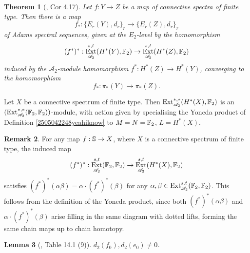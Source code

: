 \documentclass[11pt, titlepage]{article} %
\def\bb{\ensuremath\mathbb}
\def\A{\ensuremath{\mathscr{A}_2}}
\DeclareMathOperator{\Ext}{Ext}
\numberwithin{equation}{subsection}
\theoremstyle{plain}
\newtheorem{theorem}{Theorem}[subsection]
\newtheorem{lemma}[theorem]{Lemma}
\theoremstyle{definition}
\newtheorem{remark}[theorem]{Remark}
\begin{document}
\begin{theorem}[{\autocite{ass}, Cor 4.17}]\label{2504141019}
Let \(f : Y \to Z\) be a map of connective spectra of finite type. Then there is a map
\[f_* : \{E_r(Y), d_r\}_r \to \{E_r(Z), d_r\}_r\]
of Adams spectral sequences, given at the \(E_2\)-level by the homomorphism
\[(f^*)^* : \Ext_{\A}^{s,t}(H^*(Y), \bb{F}_2) \to \Ext^{s,t}_{\A}(H^*(Z), \bb{F}_2)\]
induced by the \(\A\)-module homomorphism \(f^* : H^*(Z)\to H^*(Y)\), converging to the homomorphism 
\[f_* : \pi_*(Y) \to \pi_*(Z).\]
\end{theorem}

Let \(X\) be a connective spectrum of finite type. Then \(\Ext_{\A}^{*,*}(H^*(X), \bb{F}_2)\) is an \((\Ext_{\A}^{*,*}(\bb{F}_2, \bb{F}_2))\)-module, with action given by specialising the Yoneda product of Definition \ref{2505042248yeahiknow} to \(M=N=\bb{F}_2\), \(L=H^*(X)\).

\begin{remark}\label{2504211139}
For any map \(f : \bb{S}\to X\), where \(X\) is a connective spectrum of finite type, the induced map 
\[(f^*)^* : \Ext_{\A}^{s,t}(\bb{F}_2, \bb{F}_2)\to \Ext^{s,t}_{\A}(H^*(X), \bb{F}_2)\]
satisfies \((f^*)^*(\alpha \beta)=\alpha\cdot (f^*)^*(\beta)\) for any \(\alpha, \beta\in \Ext_{\A}^{s,t}(\bb{F}_2, \bb{F}_2)\). This follows from the definition of the Yoneda product, since  both \((f^*)^*(\alpha \beta)\) and \(\alpha\cdot(f^*)^*(\beta)\) arise filling in the same diagram with dotted lifts, forming the same chain maps up to chain homotopy. 
\end{remark}

\begin{lemma}[{\autocite{rognes2}, Table 14.1 (9)}]\label{2504192017}
\(d_2(f_0), d_2(e_0)\neq 0\).
\end{lemma}
\end{document}
